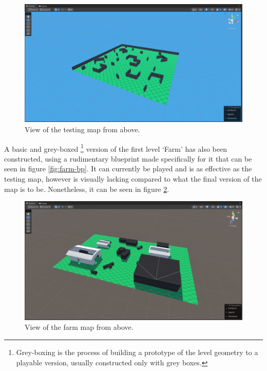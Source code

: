 \documentclass[11pt]{article}
\begin{document}
\begin{figure}[htb] 
    \centering
    \includegraphics[width=\columnwidth]{testing-map}
    \caption{View of the testing map from above.}
    \label{fig:testing-map}
\end{figure}

A basic and grey-boxed \footnote{Grey-boxing is the process of building a prototype of the level
geometry to a playable version, usually constructed only with grey boxes.} version of the first
level ‘Farm’ has also been constructed, using a rudimentary blueprint made specifically for it that
can be seen in figure \ref{fig:farm-bp}. It can currently be played and is as effective as the
testing map, however is visually lacking compared to what the final version of the map is to be.
Nonetheless, it can be seen in figure \ref{fig:farm-map}. \\

\begin{figure}[ht] 
    \centering
    \includegraphics[width=\columnwidth]{farm-map}
    \caption{View of the farm map from above.}
    \label{fig:farm-map}
\end{figure}
\end{document}
